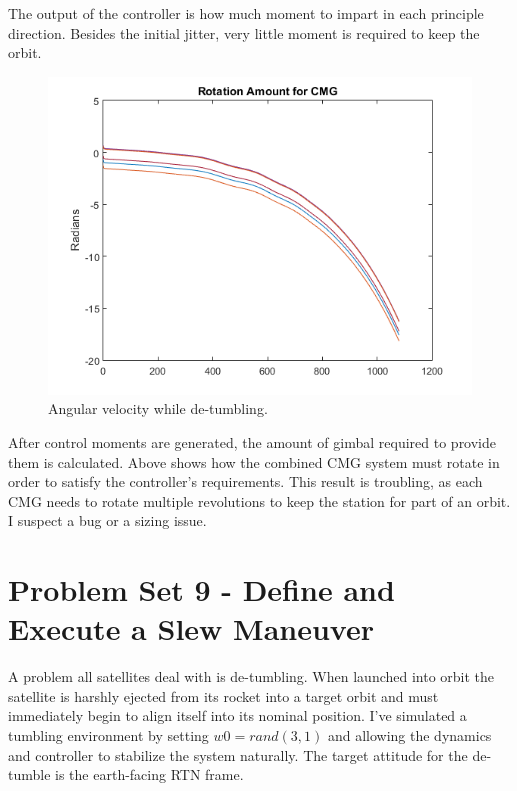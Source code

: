 \documentclass[12pt, letterpaper]{article}
\begin{document}
The output of the controller is how much moment to impart in each principle direction. Besides the initial jitter, very little moment is required to keep the orbit.

\begin{figure}[H]
	\centering
	\includegraphics[scale=0.9]{ps8_05}
	\caption{Angular velocity while de-tumbling.}
	\label{8:angvel}
\end{figure}

After control moments are generated, the amount of gimbal required to provide them is calculated. Above shows how the combined CMG system must rotate in order to satisfy the controller's requirements. This result is troubling, as each CMG needs to rotate multiple revolutions to keep the station for part of an orbit. I suspect a bug or a sizing issue.



\section{Problem Set 9 - Define and Execute a Slew Maneuver}
A problem all satellites deal with is de-tumbling. When launched into orbit the satellite is harshly ejected from its rocket into a target orbit and must immediately begin to align itself into its nominal position. I've simulated a tumbling environment by setting $w0=rand(3,1)$ and allowing the dynamics and controller to stabilize the system naturally. The target attitude for the de-tumble is the earth-facing RTN frame.
\end{document}
